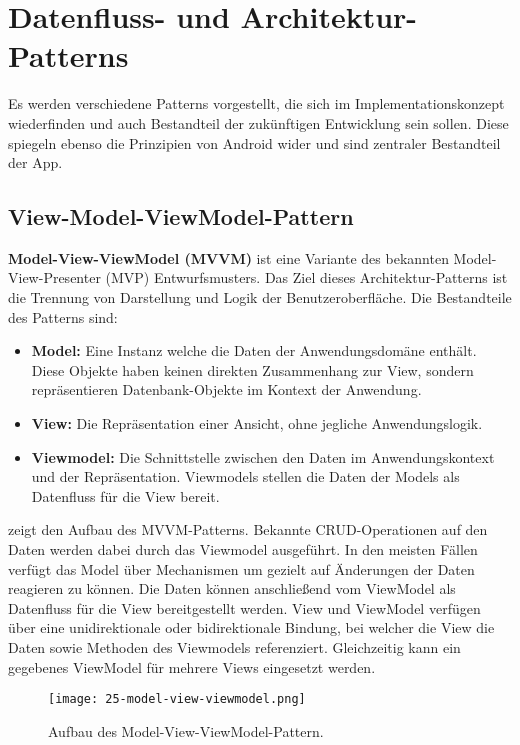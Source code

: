 \newpage

\section{Datenfluss- und Architektur-Patterns}

Es werden verschiedene Patterns vorgestellt, die sich im Implementationskonzept wiederfinden und auch Bestandteil der zukünftigen Entwicklung sein sollen. Diese spiegeln ebenso die Prinzipien von Android wider und sind zentraler Bestandteil der App.

\subsection{View-Model-ViewModel-Pattern}

\textbf{Model-View-ViewModel (MVVM)} ist eine Variante des bekannten Model-View-Presenter (MVP) Entwurfsmusters. Das Ziel dieses Architektur-Patterns ist die Trennung von Darstellung und Logik der Benutzeroberfläche. Die Bestandteile des Patterns sind:

\begin{itemize}
    \item \textbf{Model:} Eine Instanz welche die Daten der Anwendungsdomäne enthält. Diese Objekte haben keinen direkten Zusammenhang zur View, sondern repräsentieren Datenbank-Objekte im Kontext der Anwendung.
    \item \textbf{View:} Die Repräsentation einer Ansicht, ohne jegliche Anwendungslogik.
    \item \textbf{Viewmodel:} Die Schnittstelle zwischen den Daten im Anwendungskontext und der Repräsentation. Viewmodels stellen die Daten der Models als Datenfluss für die View bereit. 
\end{itemize}

 zeigt den Aufbau des MVVM-Patterns. Bekannte CRUD-Operationen auf den Daten werden dabei durch das Viewmodel ausgeführt. In den meisten Fällen verfügt das Model über Mechanismen um gezielt auf Änderungen der Daten reagieren zu können. Die Daten können anschließend vom ViewModel als Datenfluss für die View bereitgestellt werden. View und ViewModel verfügen über eine unidirektionale oder bidirektionale Bindung, bei welcher die View die Daten sowie Methoden des Viewmodels referenziert. Gleichzeitig kann ein gegebenes ViewModel für mehrere Views eingesetzt werden.

\begin{figure}[H]
    \texttt{[image: 25-model-view-viewmodel.png]}
    \caption{Aufbau des Model-View-ViewModel-Pattern.}\label{fig:mvvm}
\end{figure}

